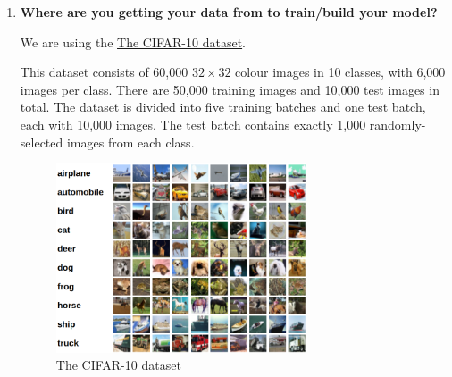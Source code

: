 \documentclass[letter]{article}
\begin{document}
\begin{itemize}
\begin{enumerate}
		\item {\textbf{Where are you getting your data from to train/build your model?}}
		\par{We are using the \href{http://www.cs.toronto.edu/~kriz/cifar.html}{The CIFAR-10 dataset}.}
		\par{This dataset consists of 60,000 $ 32\times32 $ colour images in 10 classes, with 6,000 images per class. There are 50,000 training images and 10,000 test images in total. The dataset is divided into five training batches and one test batch, each with 10,000 images. The test batch contains exactly 1,000 randomly-selected images from each class. }
		\begin{figure}[H]
			\centering
			\includegraphics[width=0.7\textwidth]{figs/fig-2.png}
			\caption{The CIFAR-10 dataset}
		\end{figure}
	

\end{enumerate}
\end{itemize}
\end{document}
